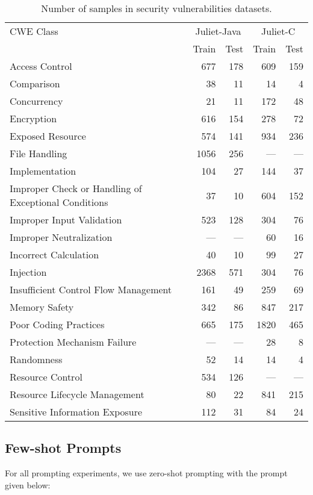 \begin{table}[h]
    \centering
    \caption{Number of samples in security vulnerabilities datasets.}
    \label{tab:vuln-datasets}
    \begin{tabular}{lrrrr}
    \toprule
         CWE Class & \multicolumn{2}{c}{Juliet-Java} & \multicolumn{2}{c}{Juliet-C}\\
         \cmidrule(lr){2-3}\cmidrule(lr){4-5}
         & Train & Test & Train & Test\\
         \midrule
         Access Control & 677 & 178 & 609 & 159 \\
Comparison & 38 & 11 & 14 & 4 \\
Concurrency & 21 & 11 & 172 & 48 \\
Encryption & 616 & 154 & 278 & 72 \\
Exposed Resource & 574 & 141 & 934 & 236 \\
File Handling & 1056 & 256 & --- & --- \\
Implementation & 104 & 27 & 144 & 37 \\
Improper Check or Handling of Exceptional Conditions & 37 & 10 & 604 & 152 \\
Improper Input Validation & 523 & 128 & 304 & 76 \\
Improper Neutralization & --- & ---  & 60 & 16 \\
Incorrect Calculation & 40 & 10 & 99 & 27 \\
Injection & 2368 & 571 & 304 & 76 \\
Insufficient Control Flow Management & 161 & 49 & 259 & 69 \\
Memory Safety & 342 & 86 & 847 & 217 \\
Poor Coding Practices & 665 & 175 & 1820 & 465 \\
Protection Mechanism Failure & --- & --- & 28 & 8 \\
Randomness & 52 & 14 & 14 & 4 \\
Resource Control & 534 & 126  & --- & --- \\
Resource Lifecycle Management & 80 & 22 & 841 & 215 \\
Sensitive Information Exposure & 112 & 31 & 84 & 24 \\
    \bottomrule
    \end{tabular}
\end{table}

\subsection{Few-shot Prompts}
\label{app:prompts}
For all prompting experiments, we use zero-shot prompting with the prompt given below:

